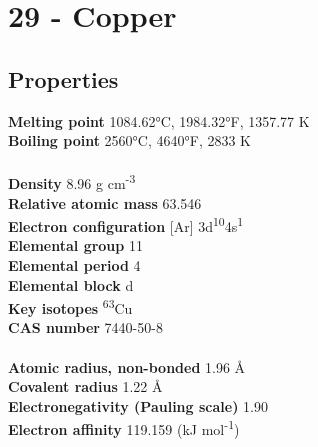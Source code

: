 \section{29 - Copper}
\label{sec:elem-copper}
\subsection{Properties}
\textbf{Melting point} 1084.62°C, 1984.32°F, 1357.77 K\\
\textbf{Boiling point} 2560°C, 4640°F, 2833 K\\
\\
\textbf{Density} 8.96 g cm\textsuperscript{-3}\\
\textbf{Relative atomic mass} 63.546\\
\textbf{Electron configuration} [Ar] 3d\textsuperscript{10}4s\textsuperscript{1}\\
\textbf{Elemental group} 11\\
\textbf{Elemental period} 4\\
\textbf{Elemental block} d\\
\textbf{Key isotopes} \textsuperscript{63}Cu\\
\textbf{CAS number} 7440-50-8\\
\\
\textbf{Atomic radius, non-bonded} 1.96 Å\\
\textbf{Covalent radius} 1.22 Å\\
\textbf{Electronegativity (Pauling scale)} 1.90\\
\textbf{Electron affinity} 119.159 (kJ mol\textsuperscript{-1})\\